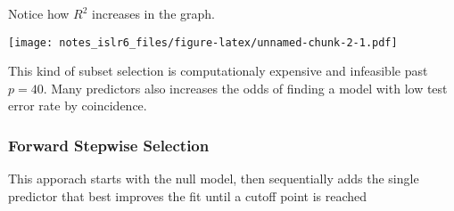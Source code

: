 \documentclass[
]{article}
\newenvironment{Shaded}{\begin{snugshade}}{\end{snugshade}}
\newcommand{\DataTypeTok}[1]{\textcolor[rgb]{0.13,0.29,0.53}{#1}}
\newcommand{\DecValTok}[1]{\textcolor[rgb]{0.00,0.00,0.81}{#1}}
\newcommand{\KeywordTok}[1]{\textcolor[rgb]{0.13,0.29,0.53}{\textbf{#1}}}
\newcommand{\NormalTok}[1]{#1}
\newcommand{\OperatorTok}[1]{\textcolor[rgb]{0.81,0.36,0.00}{\textbf{#1}}}
\newcommand{\StringTok}[1]{\textcolor[rgb]{0.31,0.60,0.02}{#1}}
\begin{document}
Notice how \(R^2\) increases in the graph.

\begin{Shaded}
\end{Shaded}

\texttt{[image: notes\_islr6\_files/figure-latex/unnamed-chunk-2-1.pdf]}

This kind of subset selection is computationaly expensive and infeasible
past \(p=40\). Many predictors also increases the odds of finding a
model with low test error rate by coincidence.

\hypertarget{forward-stepwise-selection}{%
\subsubsection{Forward Stepwise
Selection}\label{forward-stepwise-selection}}

This apporach starts with the null model, then sequentially adds the
single predictor that best improves the fit until a cutoff point is
reached
\end{document}
